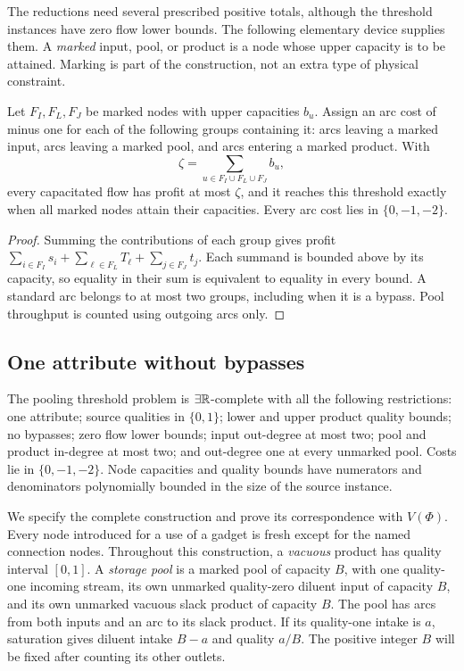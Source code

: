 The reductions need several prescribed positive totals, although the
threshold instances have zero flow lower bounds. The following elementary
device supplies them. A \emph{marked} input, pool, or product is a node
whose upper capacity is to be attained. Marking is part of the construction,
not an extra type of physical constraint.

\begin{lemma}\label{s2:saturation}
Let $F_I,F_L,F_J$ be marked nodes with upper capacities $b_u$.
Assign an arc cost of minus one for each of the following groups
containing it: arcs leaving a marked input, arcs leaving a marked pool,
and arcs entering a marked product. With
\[
 \zeta=\sum_{u\in F_I\cup F_L\cup F_J}b_u,
\]
every capacitated flow has profit at most $\zeta$, and it reaches this
threshold exactly when all marked nodes attain their capacities.
Every arc cost lies in $\{0,-1,-2\}$.
\end{lemma}
\begin{proof}
Summing the contributions of each group gives profit
$\sum_{i\in F_I}s_i+\sum_{\ell\in F_L}T_\ell+
\sum_{j\in F_J}t_j$. Each summand is bounded above by its capacity,
so equality in their sum is equivalent to equality in every bound.
A standard arc belongs to at most two groups, including when it is
a bypass. Pool throughput is counted using outgoing arcs only.
\end{proof}

\subsection{One attribute without bypasses}\label{s2:many-pools}

\begin{theorem}\label{s2:etr-complete}
The pooling threshold problem is $\exists\mathbb R$-complete with all the following
restrictions: one attribute; source qualities in $\{0,1\}$; lower and upper
product quality bounds; no bypasses; zero flow lower bounds; input
out-degree at most two; pool and product in-degree at most two; and
out-degree one at every unmarked pool. Costs lie in $\{0,-1,-2\}$.
Node capacities and quality bounds have numerators and denominators
polynomially bounded in the size of the source instance.
\end{theorem}

We specify the complete construction and prove its correspondence with
$V(\Phi)$. Every node introduced for a use of a gadget is fresh except
for the named connection nodes. Throughout this construction, a
\emph{vacuous} product has quality interval $[0,1]$. A \emph{storage pool}
is a marked pool of capacity $B$, with one quality-one incoming stream,
its own unmarked quality-zero diluent input of capacity $B$, and its own
unmarked vacuous slack product of capacity $B$. The pool has arcs from
both inputs and an arc to its slack product. If its quality-one intake
is $a$, saturation gives diluent intake $B-a$ and quality $a/B$.
The positive integer $B$ will be fixed after counting its other outlets.

